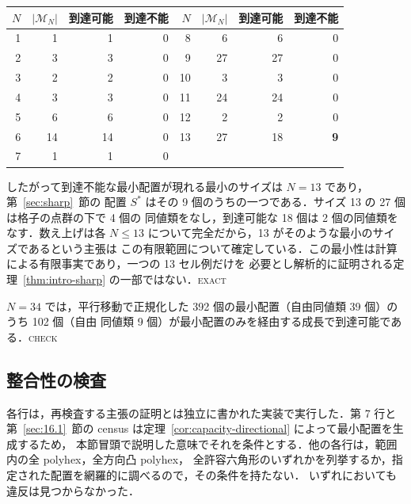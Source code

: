 \documentclass[11pt]{article}
\theoremstyle{plain}
\theoremstyle{definition}
\theoremstyle{remark}
\begin{document}
\begin{center}
\begin{tabular}{rrrr@{\qquad}rrrr}
\toprule
\(N\) & \(|\mathcal{M}_{N}|\) & 到達可能 & 到達不能 &
\(N\) & \(|\mathcal{M}_{N}|\) & 到達可能 & 到達不能 \\
\midrule
1 & 1 & 1 & 0 &  8 & 6 & 6 & 0 \\
2 & 3 & 3 & 0 &  9 & 27 & 27 & 0 \\
3 & 2 & 2 & 0 & 10 & 3 & 3 & 0 \\
4 & 3 & 3 & 0 & 11 & 24 & 24 & 0 \\
5 & 6 & 6 & 0 & 12 & 2 & 2 & 0 \\
6 & 14 & 14 & 0 & 13 & 27 & 18 & \textbf{9} \\
7 & 1 & 1 & 0 &    &    &    &   \\
\bottomrule
\end{tabular}
\end{center}

したがって到達不能な最小配置が現れる最小のサイズは \(N=13\) であり，第~\ref{sec:sharp}~節の
配置 \(S^{*}\) はその 9 個のうちの一つである．サイズ 13 の 27 個は格子の点群の下で 4 個の
同値類をなし，到達可能な 18 個は 2 個の同値類をなす．数え上げは各 \(N\le13\) について完全だから，13 がそのような最小のサイズであるという主張は
この有限範囲について確定している．この最小性は計算による有限事実であり，一つの 13 セル例だけを
必要とし解析的に証明される定理~\ref{thm:intro-sharp} の一部ではない．\textsc{exact}

\(N=34\) では，平行移動で正規化した 392 個の最小配置（自由同値類 39 個）のうち 102 個（自由
同値類 9 個）が最小配置のみを経由する成長で到達可能である．\textsc{check}

\subsection{整合性の検査}\label{sec:16.2}

各行は，再検査する主張の証明とは独立に書かれた実装で実行した．第 7 行と
第~\ref{sec:16.1}~節の census は定理~\ref{cor:capacity-directional} によって最小配置を生成するため，
本節冒頭で説明した意味でそれを条件とする．他の各行は，範囲内の全 polyhex，全方向凸 polyhex，
全許容六角形のいずれかを列挙するか，指定された配置を網羅的に調べるので，その条件を持たない．
いずれにおいても違反は見つからなかった．
\end{document}

